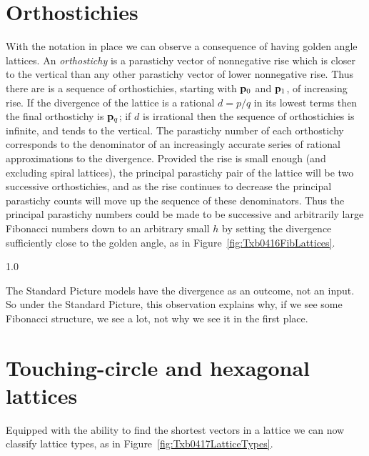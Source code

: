 \section{Orthostichies}
With the notation in place we can observe a consequence of having golden angle lattices. An \textit{orthostichy} is a parastichy vector of nonnegative rise which is closer to the vertical than any other parastichy vector of lower nonnegative rise.%
 Thus there are is a sequence of orthostichies,  starting with ${\mathbf p}_{0}$ and ${\mathbf p}_{1}$, of increasing rise. If the divergence of the lattice is a rational $d=p/q$ in its lowest terms then the final orthostichy is ${\mathbf p}_{q}$; if $d$ is irrational then the sequence of orthostichies is infinite, and tends to the vertical. The parastichy number of each orthostichy corresponds to the denominator of an increasingly accurate series of rational approximations to the divergence. Provided the rise is small enough (and excluding spiral lattices), the principal parastichy pair of the lattice will be two successive orthostichies,
and as the rise continues to decrease the principal parastichy counts will move up the sequence of these denominators. Thus the principal parastichy numbers could be made to be successive and arbitrarily large Fibonacci numbers down to an arbitrary small $h$ by setting the divergence sufficiently close to the golden angle, as in Figure~\ref{fig:Txb0416FibLattices}.

{1.0}

The Standard Picture models have the divergence as an outcome, not an input. So under the Standard Picture, this observation explains why, if we see some Fibonacci structure, we see a lot, not why we see it in the first place. 



\section{Touching-circle and hexagonal lattices}
\label{sec:hexdef}
Equipped with the ability to find the shortest vectors in a lattice we can now classify lattice types, as in Figure~\ref{fig:Txb0417LatticeTypes}.

